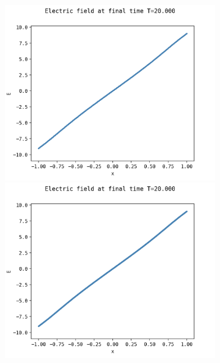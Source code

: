 \documentclass{article}
\numberwithin{equation}{section}
\newcommand{\imh}{\textheight} %
\newcommand{\imw}{\textwidth} %
\begin{document}
\begin{figure}
	\centering
	\newcommand{\rootSL}{../code_SL/}
	\newcommand{\rootFD}{../temp_res_DF/}
	\newcommand{\dirSL}{run_comp_long_time_2sp_Nx1000_Nvi2001_Nve2001_Nt100000}
	\newcommand{\dirFD}{run_comp_long_time_2sp_Nx200_Nv400_Nt2500000}
	
	\renewcommand{\imh}{0.24\textheight}
	\renewcommand{\imw}{0.45\linewidth}
	
	\begin{subfigure}{\textwidth}
		\centering
		\includegraphics[height=\imh,width=\imw]{images/E_run5ab.png}
		\includegraphics[height=\imh,width=\imw]{images/E_run5ac.png}

\end{subfigure}
\end{figure}
\end{document}
